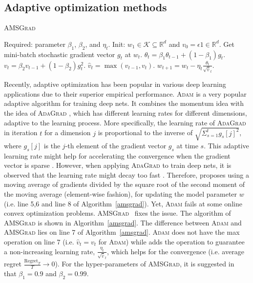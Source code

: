 \documentclass[11pt]{article}
\def\K{\mathcal{K}}
\theoremstyle{k}
\begin{document}
\subsection{Adaptive optimization methods}

\begin{algorithm}[t]
\begin{algorithmic}[1]
\small
\caption{\textsc{AMSGrad} \cite{RKK18}} \label{amsgrad}
\STATE Required: parameter $\beta_1$, $\beta_2$, and $\eta_t$. 
\STATE Init: $w_{1} \in \K \subseteq \mathbb R^d $ and $v_{0} = \epsilon 1 \in \mathbb R^{d}$.
\STATE Get mini-batch stochastic gradient vector $g_t$ at $w_t$.
\STATE $\theta_t = \beta_1 \theta_{t-1} + (1 - \beta_1) g_t$.
\STATE $v_t = \beta_2 v_{t-1} + (1 - \beta_2) g_t^2$. 
\STATE $\hat{v}_t = \max( \hat{v}_{t-1} , v_t )$. 
\STATE $w_{t+1} = w_t - \eta_t \frac{\theta_t}{ \sqrt{\hat{v}}_t }$.
\ENDFOR
\end{algorithmic}
\end{algorithm}


Recently, adaptive optimization has been popular in various deep learning applications due to their superior empirical performance. \textsc{Adam} \cite{KB15} is a very popular adaptive algorithm for training deep nets.
It combines the momentum idea \cite{P64} with the idea of \textsc{AdaGrad} \cite{DHS11},
which has different learning rates for different dimensions, adaptive to the learning process. More specifically, the learning rate of \textsc{AdaGrad} in iteration $t$ for a dimension $j$ is proportional to the inverse of $\sqrt{ \Sigma_{s=1}^t g_s[j]^2 }$,
where $g_s[j]$ is the $j$-th element of the gradient vector $g_s$ 
at time $s$.
This adaptive learning rate might help for accelerating the convergence when the gradient vector is sparse \cite{DHS11}. However,
when applying \textsc{AdaGrad} to train deep nets,
it is observed that the learning rate might decay too fast \cite{KB15}.
Therefore, \cite{KB15} proposes using a moving average of gradients 
divided by the square root of the second moment of the moving average (element-wise fashion), for updating the model parameter $w$ (i.e. line 5,6 and line 8 of Algorithm~\ref{amsgrad}).
Yet, \textsc{Adam} \cite{KB15} fails at some online convex optimization problems. \textsc{AMSGrad}~\cite{RKK18} fixes the issue. 
The algorithm of \textsc{AMSGrad} is shown in Algorithm~\ref{amsgrad}.
The difference between \textsc{Adam} and 
\textsc{AMSGrad} lies on line 7 of Algorithm~\ref{amsgrad}.
\textsc{Adam} does not have the max operation on line 7 (i.e. $\hat{v}_t = v_t$ for \textsc{Adam}) while
\cite{RKK18} adds the operation to guarantee a non-increasing learning rate,
$\frac{\eta_t }{ \sqrt{\hat{v}}_t }$,
which helps for the convergence (i.e. average regret $\frac{\text{Regret}_T}{T} \rightarrow 0$).
For the hyper-parameters of \textsc{AMSGrad}, it is suggested in~\cite{RKK18} that $\beta_1=0.9$ and $\beta_2=0.99$.
\end{document}

